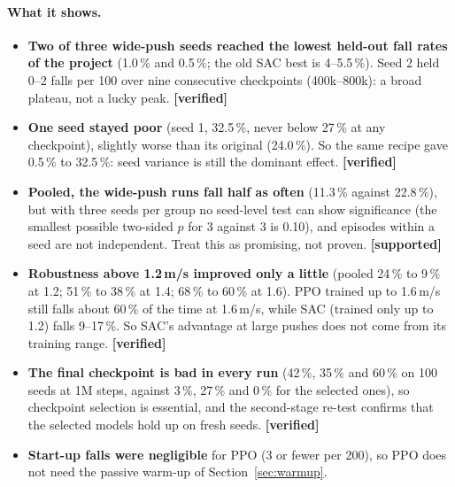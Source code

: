 \documentclass[11pt,a4paper]{article}
\newcommand{\tagv}{\textbf{[verified]}}
\newcommand{\tags}{\textbf{[supported]}}
\begin{document}
\paragraph{What it shows.}
\begin{itemize}
\item \textbf{Two of three wide-push seeds reached the lowest held-out fall rates of the project} (1.0\,\% and 0.5\,\%; the old SAC best is 4--5.5\,\%). Seed 2 held 0--2 falls per 100 over nine consecutive checkpoints (400k--800k): a broad plateau, not a lucky peak. \tagv
\item \textbf{One seed stayed poor} (seed 1, 32.5\,\%, never below 27\,\% at any checkpoint), slightly worse than its original (24.0\,\%). So the same recipe gave 0.5\,\% to 32.5\,\%: seed variance is still the dominant effect. \tagv
\item \textbf{Pooled, the wide-push runs fall half as often} (11.3\,\% against 22.8\,\%), but with three seeds per group no seed-level test can show significance (the smallest possible two-sided $p$ for 3 against 3 is 0.10), and episodes within a seed are not independent. Treat this as promising, not proven. \tags
\item \textbf{Robustness above 1.2\,m/s improved only a little} (pooled 24\,\% to 9\,\% at 1.2; 51\,\% to 38\,\% at 1.4; 68\,\% to 60\,\% at 1.6). PPO trained up to 1.6\,m/s still falls about 60\,\% of the time at 1.6\,m/s, while SAC (trained only up to 1.2) falls 9--17\,\%. So SAC's advantage at large pushes does not come from its training range. \tagv
\item \textbf{The final checkpoint is bad in every run} (42\,\%, 35\,\% and 60\,\% on 100 seeds at 1M steps, against 3\,\%, 27\,\% and 0\,\% for the selected ones), so checkpoint selection is essential, and the second-stage re-test confirms that the selected models hold up on fresh seeds. \tagv
\item \textbf{Start-up falls were negligible} for PPO (3 or fewer per 200), so PPO does not need the passive warm-up of Section~\ref{sec:warmup}.
\end{itemize}
\end{document}
